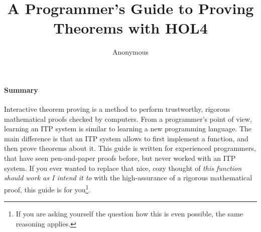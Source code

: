 \documentclass[10pt]{scrartcl}
\title{A Programmer's Guide to Proving Theorems with HOL4}
\author{Anonymous}
\date{}
\begin{document}
\maketitle{}

\paragraph*{Summary}
Interactive theorem proving is a method to perform trustworthy, rigorous
mathematical proofs checked by computers.
From a programmer's point of view, learning an ITP system is similar to
learning a new programming language.
The main difference is that an ITP system allows to first implement a function,
and then prove theorems about it.
This guide is written for experienced programmers, that have seen pen-and-paper
proofs before, but never worked with an ITP system.
If you ever wanted to replace that nice, cozy thought of \emph{this function
should work as I intend it to} with the high-assurance of a rigorous
mathematical proof, this guide is for you\footnote{If you are asking yourself the question how this is even possible, the same reasoning applies.}.
%

%

%

%

%

%

%
\appendix

%
\printbibliography
%
\end{document}

